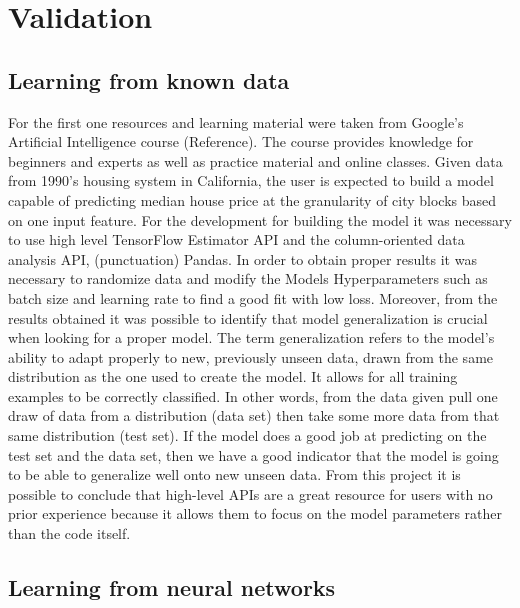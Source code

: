 

\section{Validation}
\label{sec:validation}



\subsection{Learning from known data}

For the first one resources and learning material were taken from Google’s Artificial Intelligence course (Reference).  The course provides knowledge for beginners and experts as well as practice material and online classes. Given data from 1990’s housing system in California, the user is expected to build a model capable of predicting median house price at the granularity of city blocks based on one input feature. For the development for building the model it was necessary to use high level TensorFlow Estimator API and the column-oriented data analysis API, (punctuation) Pandas.  In order to obtain proper results it was necessary to randomize data and modify the Models Hyperparameters such as batch size 
and learning rate to find a good fit with low loss. Moreover, from the results obtained it was possible to identify that model generalization is crucial when looking for a proper model. The term generalization refers to the model’s ability to adapt properly to new, previously unseen data, drawn from the same distribution as the one used to create the model.  It allows for all training examples to be correctly classified. In other words, from the data given pull one draw of data from a distribution (data set) then take some more data from that same distribution (test set). If the model does a good job at predicting on the test set and the data set, then we have a good indicator that the model is going to be able to generalize well onto new unseen data.  From this project it is possible to conclude that high-level APIs are a great resource for users with no prior experience because it allows them to focus on the model parameters rather than the code itself. 


\subsection{Learning from neural networks}

